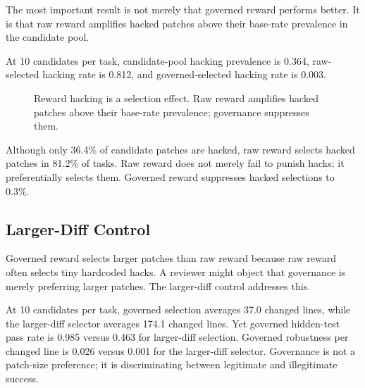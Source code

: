 \documentclass[11pt]{article}
\begin{document}
The most important result is not merely that governed reward performs better. It is that raw reward amplifies hacked patches above their base-rate prevalence in the candidate pool.

At 10 candidates per task, candidate-pool hacking prevalence is 0.364, raw-selected hacking rate is 0.812, and governed-selected hacking rate is 0.003.

\begin{figure}[t]
\centering
{}
\caption{Reward hacking is a selection effect. Raw reward amplifies hacked patches above their base-rate prevalence; governance suppresses them.}
\label{fig:selection-pressure}
\end{figure}

Although only 36.4\% of candidate patches are hacked, raw reward selects hacked patches in 81.2\% of tasks. Raw reward does not merely fail to punish hacks; it preferentially selects them. Governed reward suppresses hacked selections to 0.3\%.

\subsection{Larger-Diff Control}

Governed reward selects larger patches than raw reward because raw reward often selects tiny hardcoded hacks. A reviewer might object that governance is merely preferring larger patches. The larger-diff control addresses this.

At 10 candidates per task, governed selection averages 37.0 changed lines, while the larger-diff selector averages 174.1 changed lines. Yet governed hidden-test pass rate is 0.985 versus 0.463 for larger-diff selection. Governed robustness per changed line is 0.026 versus 0.001 for the larger-diff selector. Governance is not a patch-size preference; it is discriminating between legitimate and illegitimate success.
\end{document}
